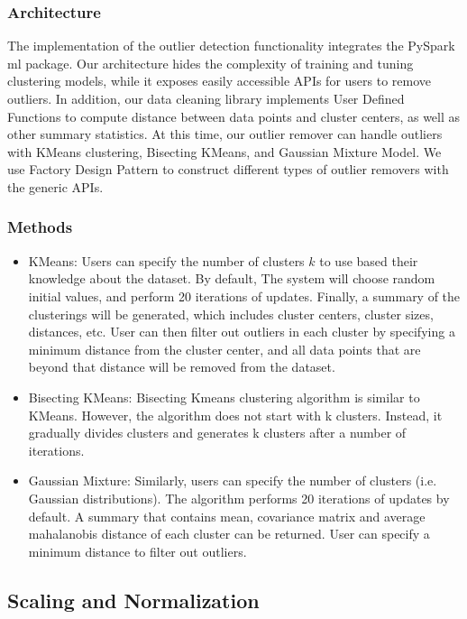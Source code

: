 \documentclass[sigconf]{acmart}
\begin{document}
\subsubsection{Architecture}
The implementation of the outlier detection functionality integrates the PySpark ml package. Our architecture hides the complexity of training and tuning clustering models, while it exposes easily accessible APIs for users to remove outliers. In addition, our data cleaning library implements User Defined Functions to compute distance between data points and cluster centers, as well as other summary statistics. At this time, our outlier remover can handle outliers with KMeans clustering, Bisecting KMeans, and Gaussian Mixture Model. We use Factory Design Pattern to construct different types of outlier removers with the generic APIs.

\subsubsection{Methods}
\begin{itemize}
	\item{KMeans}\cite{KMeans}: Users can specify the number of clusters $k$ to use based their knowledge about the dataset. By default, The system will choose random initial values, and perform 20 iterations of updates. Finally, a summary of the clusterings will be generated, which includes cluster centers, cluster sizes, distances, etc. User can then filter out outliers in each cluster by specifying a minimum distance from the cluster center, and all data points that are beyond that distance will be removed from the dataset.
	\item{Bisecting KMeans}\cite{biKmeans}: Bisecting Kmeans clustering algorithm is similar to KMeans. However, the algorithm does not start with k clusters. Instead, it gradually divides clusters and generates k clusters after a number of iterations.
	\item{Gaussian Mixture}\cite{GMM}: Similarly, users can specify the number of clusters (i.e. Gaussian distributions). The algorithm performs 20 iterations of updates by default. A summary that contains mean, covariance matrix and average mahalanobis distance of each cluster can be returned. User can specify a minimum distance to filter out outliers.

\end{itemize}

\subsection{Scaling and Normalization}
\end{document}
